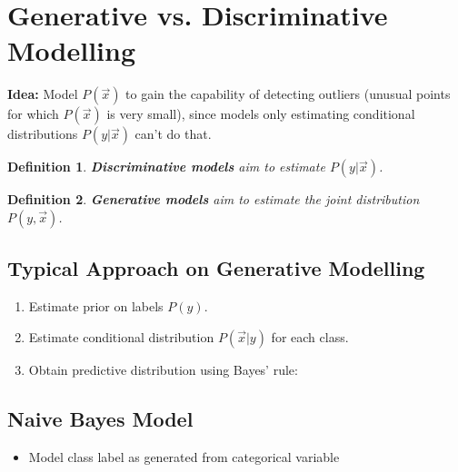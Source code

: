 \documentclass[10pt,a4paper]{scrartcl}
\newtheorem{define}{Definition}
\begin{document}
\begin{multicols*}{2}
\begin{itemize}
\end{itemize}

\section{Generative vs. Discriminative Modelling}

\textbf{Idea:} Model $P(\vec{x})$ to gain the capability of detecting outliers (unusual points for which $P(\vec{x})$ is very small), since models only estimating conditional distributions $P(y|\vec{x})$ can't do that.

\begin{define}
\textbf{Discriminative models} aim to estimate $P(y|\vec{x})$.
\end{define}

\begin{define}
\textbf{Generative models} aim to estimate the joint distribution $P(y,\vec{x})$.
\end{define}

\subsection{Typical Approach on Generative Modelling}

\begin{enumerate}
\item Estimate prior on labels $P(y)$.
\item Estimate conditional distribution $P(\vec{x}|y)$ for each class.
\item Obtain predictive distribution using Bayes' rule:

\end{enumerate}

\subsection{Naive Bayes Model}

\begin{itemize}
\item Model class label as generated from categorical variable



\end{itemize}
\end{multicols*}
\end{document}
